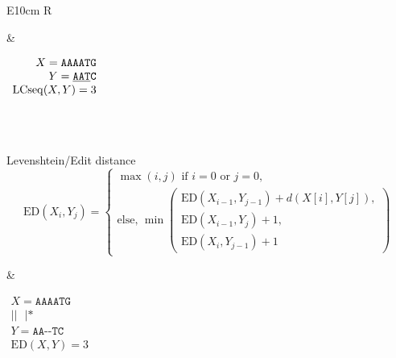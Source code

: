 \begin{table}
{\begin{tabularx}{\textwidth}{E{10cm}   R}
\begin{minipage}{10cm}
            \vspace{0.5cm}
        \end{minipage}
        &
        \hfill
        \begin{minipage}{4cm} \renewcommand{\arraystretch}{1}
            \hfill
            $\begin{array}{r}
                X= \mathrm{\texttt{AAAATG}}\\
                Y= \mathrm{\texttt{\underline{AAT}C}}\\
                \mathrm{LCseq}(X,Y)=3
            \end{array}$
        \end{minipage}\\
        \hline \\
        \begin{minipage}{10cm} \renewcommand{\arraystretch}{1}
            Levenshtein/Edit distance \\
            $$ \mathrm{ED}(X_i,Y_j)= \left\{
                \begin{array}{l}
                    \max(i,j) \mbox{ if } i=0 \mbox{ or } j=0 {,} \\
                    \mbox{else, } \min 
                    \begin{pmatrix}
                        \mathrm{ED}(X_{i-1},Y_{j-1})+d(X[i],Y[j]), \\
                        \mathrm{ED}(X_{i-1},Y_j)+1, \\
                        \mathrm{ED}(X_i,Y_{j-1})+1
                    \end{pmatrix} 
                \end{array} \right. $$
                \vspace{0.5cm}
            \end{minipage}
            &
            \hfill
            \begin{minipage}{4cm} \renewcommand{\arraystretch}{1}
                \hfill
                $\begin{array}{r}
                    X= \mathrm{\texttt{AAAATG}}\\
                    \mathrm{\texttt{||~~|*}}\\
                    Y= \mathrm{\texttt{AA-{-}TC}}\\
                    \mathrm{ED}(X,Y)=3
                \end{array}$
        \end{minipage}\\

\end{tabularx}}
\end{table}
